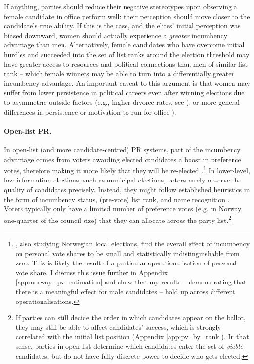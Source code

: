 \documentclass[12pt]{article}
\begin{document}
If anything, parties should reduce their negative stereotypes upon observing a female candidate in office perform well: their perception should move closer to the candidate's true ability. If this is the case, and the elites' initial perception was biased downward, women should actually experience a \emph{greater} incumbency advantage than men. Alternatively, female candidates who have overcome initial hurdles and succeeded into the set of list ranks around the election threshold may have greater access to resources and political connections than men of similar list rank -- which female winners may be able to turn into a differentially greater incumbency advantage. An important caveat to this argument is that women may suffer from lower persistence in political careers even after winning elections due to asymmetric outside factors (e.g., higher divorce rates, see \citet{folke2020}), or more general differences in persistence or motivation to run for office \citep{lawless2005, wasserman2020,ashworth2021}).

\paragraph*{Open-list PR.} In open-list (and more candidate-centred) PR systems, part of the incumbency advantage comes from voters awarding elected candidates a boost in preference votes, therefore making it more likely that they will be re-elected \citep{dahlgaard2016, dettman2017, jankowski2021}.\footnote{\citet{fiva2018a}, also studying Norwegian local elections, find the overall effect of incumbency on personal vote shares to be small and statistically indistinguishable from zero. This is likely the result of a particular operationalisation of personal vote share. I discuss this issue further in Appendix \ref{app:norway_pv_estimation} and show that my results -- demonstrating that there is a meaningful effect for male candidates -- hold up across different operationalisations.} In lower-level, low-information elections, such as municipal elections, voters rarely observe the quality of candidates precisely. Instead, they might follow established heuristics in the form of incumbency status, (pre-vote) list rank, and name recognition \citep{dettman2017}. Voters typically only have a limited number of preference votes (e.g. in Norway, one-quarter of the council size) that they can allocate across the party list.\footnote{If parties can still decide the order in which candidates appear on the ballot, they may still be able to affect candidates' success, which is strongly correlated with the initial list position (Appendix \ref{app:pv_by_rank}). In that sense, parties in open-list determine which candidates enter the set of \emph{viable} candidates, but do not have fully discrete power to decide who gets elected.}
\end{document}
